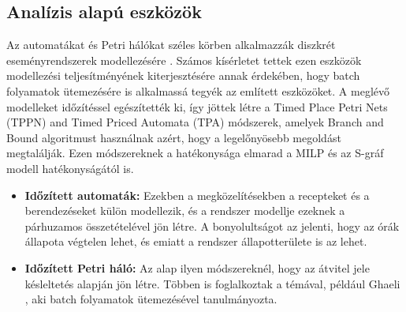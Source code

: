 \subsection{Analízis alapú eszközök}
Az automatákat és Petri hálókat széles körben alkalmazzák diszkrét eseményrendszerek modellezésére \cite{cassandras}. Számos kísérletet tettek ezen eszközök modellezési teljesítményének kiterjesztésére annak érdekében, hogy batch folyamatok ütemezésére is alkalmassá tegyék az említett eszközöket. A meglévő modelleket időzítéssel egészítették ki, így jöttek létre a Timed Place Petri Nets (TPPN) and Timed Priced Automata (TPA) módszerek, amelyek Branch and Bound algoritmust használnak azért, hogy a legelőnyösebb megoldást megtalálják. Ezen módszereknek a hatékonysága elmarad a MILP és az S-gráf modell hatékonyságától is.
\begin{itemize}
	\item[] \textbf{Időzített automaták:} Ezekben a megközelítésekben a recepteket és a berendezéseket külön modellezik, és a rendszer modellje ezeknek a párhuzamos összetételével jön létre. A bonyolultságot az jelenti, hogy az órák állapota végtelen lehet, és emiatt a rendszer állapotterülete is az lehet.
	\item[] \textbf{Időzített Petri háló:} Az alap ilyen módszereknél, hogy az átvitel jele késleltetés alapján jön létre. Többen is foglalkoztak a témával, például Ghaeli \cite{ghaeli}, aki batch folyamatok ütemezésével tanulmányozta.
\end{itemize}

